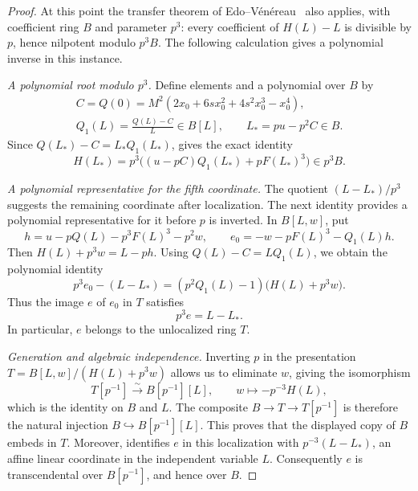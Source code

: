 \begin{proof}
At this point the transfer theorem of
Edo--V\'en\'ereau~\cite[Theorem~7]{EdoVenereau} also applies, with
coefficient ring $B$ and parameter $p^3$: every coefficient of
$H(L)-L$ is divisible by $p$, hence nilpotent modulo $p^3B$.
The following calculation gives a polynomial inverse in this instance.

\smallskip
\noindent\emph{A polynomial root modulo \(p^3\).}
Define elements and a polynomial over \(B\) by
\begin{equation}\label{con:root}
 \begin{gathered}
 C=Q(0)=M^2(2x_0+6sx_0^2+4s^2x_0^3-x_0^4),\\
 Q_1(L)=\frac{Q(L)-C}{L}\in B[L],\qquad
 L_*=pu-p^2C\in B.
 \end{gathered}
\end{equation}
Since \(Q(L_*)-C=L_*Q_1(L_*)\),  gives the exact
identity
\begin{equation}\label{con:root-divisibility}
 H(L_*)=p^3\bigl((u-pC)Q_1(L_*)+pF(L_*)^3\bigr)\in p^3B.
\end{equation}

\smallskip
\noindent\emph{A polynomial representative for the fifth coordinate.}
The quotient $(L-L_*)/p^3$ suggests the remaining coordinate after
localization. The next identity provides a polynomial representative
for it before $p$ is inverted.
In \(B[L,w]\), put
\begin{equation}\label{con:e-polynomial}
 h=u-pQ(L)-p^3F(L)^3-p^2w,
 \qquad e_0=-w-pF(L)^3-Q_1(L)h.
\end{equation}
Then \(H(L)+p^3w=L-ph\). Using \(Q(L)-C=LQ_1(L)\), we obtain the
polynomial identity
\begin{equation}\label{con:e-certificate}
 p^3e_0-(L-L_*)
   =(p^2Q_1(L)-1)\bigl(H(L)+p^3w\bigr).
\end{equation}
Thus the image \(e\) of \(e_0\) in \(T\) satisfies
\begin{equation}\label{con:e-relation}
 p^3e=L-L_*.
\end{equation}
In particular, \(e\) belongs to the unlocalized ring \(T\).

\smallskip
\noindent\emph{Generation and algebraic independence.}
Inverting \(p\) in the presentation
\(T=B[L,w]/(H(L)+p^3w)\) allows us to eliminate \(w\), giving the
isomorphism
\begin{equation}\label{con:t-localized}
 T[p^{-1}]\xrightarrow{\ \sim\ }B[p^{-1}][L],
 \qquad w\longmapsto-p^{-3}H(L),
\end{equation}
which is the identity on \(B\) and \(L\). The composite
\(B\to T\to T[p^{-1}]\) is therefore the natural injection
\(B\hookrightarrow B[p^{-1}][L]\). This proves that the displayed copy
of \(B\) embeds in \(T\). Moreover,  identifies
\(e\) in this localization with \(p^{-3}(L-L_*)\), an affine linear
coordinate in the independent variable \(L\). Consequently \(e\) is
transcendental over \(B[p^{-1}]\), and hence over \(B\).


\end{proof}
